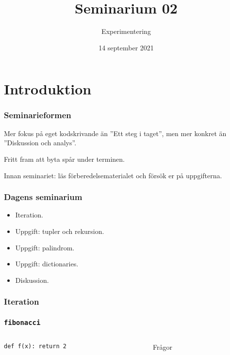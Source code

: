 \documentclass{beamer}
\title{Seminarium 02}
\subtitle{Experimentering}
\date{14 september 2021}
\begin{document}
  \frame{\titlepage}

  \section*{Introduktion}

  \begin{frame}
    \frametitle{Seminarieformen}

    Mer fokus på eget kodskrivande än ''Ett steg i taget'', men mer konkret än
    ''Diskussion och analys''.

    Fritt fram att byta spår under terminen.

    Innan seminariet: läs förberedelsematerialet och försök er på uppgifterna.

  \end{frame}

  \begin{frame}
    \frametitle{Dagens seminarium}

    \begin{itemize}
      \item Iteration.
      \item Uppgift: tupler och rekursion.
      \item Uppgift: palindrom.
      \item Uppgift: dictionaries.
      \item Diskussion.
    \end{itemize}

  \end{frame}

  \begin{frame}
    \frametitle{Iteration}

  \end{frame}

  \begin{frame}[fragile]
    \frametitle{\texttt{fibonacci}}

    \begin{columns}
      \begin{column}{0.48\textwidth}
        \begin{verbatim}
def f(x): return 2
        \end{verbatim}
      \end{column}%
      \begin{column}{0.48\textwidth}
        Frågor
      \end{column}%
    \end{columns}
  \end{frame}
\end{document}
